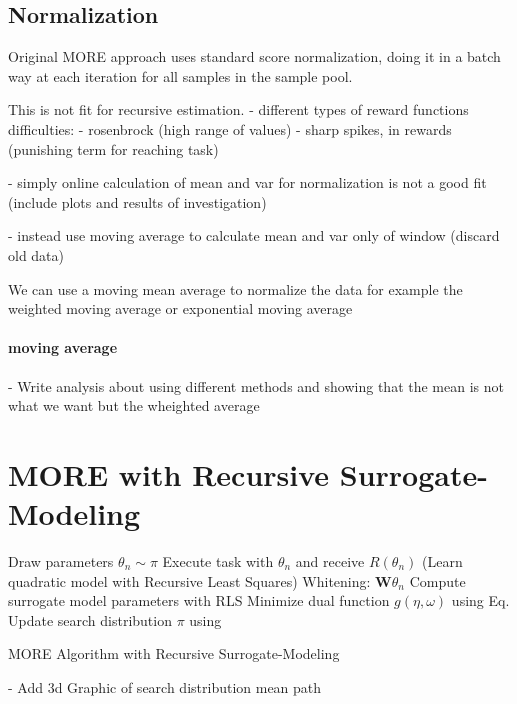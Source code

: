 \subsection{Normalization}
Original MORE approach uses standard score normalization, doing it
in a batch way at each iteration for all samples in the sample pool.

This is not fit for recursive estimation.
- different types of reward functions difficulties:
- rosenbrock (high range of values)
- sharp spikes, in rewards (punishing term for reaching task)

- simply online calculation of mean and var for normalization is not
a good fit (include plots and results of investigation)

- instead use moving average to calculate mean and var only of window (discard old
  data) 

We can use a moving mean average to normalize the data for example
the weighted moving average or exponential moving average

\paragraph{moving average}
- Write analysis about using different methods and showing that the mean
is not what we want but the wheighted average


\section{MORE with Recursive Surrogate-Modeling}
\begin{algorithm}[H]
\DontPrintSemicolon
\SetAlgoLined
{}

{
  {
    Draw parameters $\theta_n \sim \pi$\;
    Execute task with $\theta_n$ and receive $R(\theta_n)$\;
  }
  \Begin(Learn quadratic model with Recursive Least Squares)
  {
    {
      Whitening: $\mathbf{W}\theta_n$\;
      Compute surrogate model parameters with RLS
    }
  }
  Minimize dual function $g(\eta, \omega)$ using Eq.\;
  Update search distribution $\pi$ using  \;
}
\caption{MORE Algorithm with Recursive Surrogate-Modeling}
\end{algorithm}

- Add 3d Graphic of search distribution mean path


